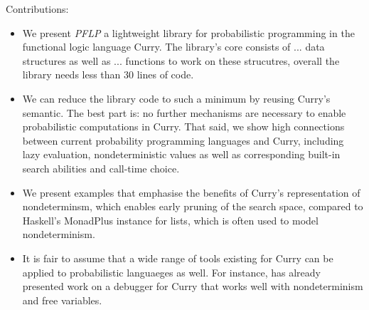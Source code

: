 \documentclass[
12pt, %
a4paper, %
oneside, %
]{llncs}
\begin{document}


Contributions:
\begin{itemize}
\item We present \emph{PFLP} a lightweight library for probabilistic
  programming in the functional logic language Curry. %
  The library's core consists of ... data structures as well as
  ... functions to work on these strucutres, overall the library needs
  less than 30 lines of code. %
\item We can reduce the library code to such a minimum by reusing Curry's
  semantic. %
  The best part is: no further mechanisms are necessary to enable
  probabilistic computations in Curry. %
  That said, we show high connections between current probability
  programming languages and Curry, including lazy evaluation,
  nondeterministic values as well as corresponding built-in search
  abilities and call-time choice. %
\item We present examples that emphasise the benefits of Curry's
  representation of nondeterminsm, which enables early pruning of the
  search space, compared to Haskell's MonadPlus instance for lists,
  which is often used to model nondeterminism. %
\item It is fair to assume that a wide range of tools existing for
  Curry can be applied to probabilistic languaeges as well. %
  For instance, \cite{Brassel-BIO} has already presented work on a
  debugger for Curry that works well with nondeterminism and free
  variables. %
\end{itemize}
\end{document}
